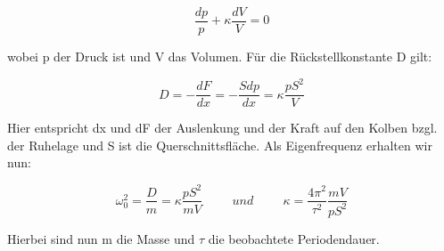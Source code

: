 \documentclass{article}
\begin{document}
{\begin{equation}
\frac{dp}{p}+\kappa \frac{dV}{V}=0
\end{equation}

wobei p der Druck ist und V das Volumen. Für die Rückstellkonstante D gilt:

\begin{equation}
D=-\frac{dF}{dx}=-\frac{Sdp}{dx}=\kappa \frac{pS^2}{V}
\end{equation}

Hier entspricht dx und dF der Auslenkung und der Kraft auf den Kolben bzgl. der Ruhelage und S ist die Querschnittsfläche. Als Eigenfrequenz erhalten wir nun:

\begin{equation}
\label{25}
\omega_{0}^2=\frac{D}{m}=\kappa \frac{pS^2}{mV} \hspace{1cm} und \hspace{1cm} \kappa =\frac{4\pi ^2}{\tau ^2} \frac{mV}{pS^2}
\end{equation}

Hierbei sind nun m die Masse und \(\tau\) die beobachtete Periodendauer.

{\begin{center}
\begin{minipage}{\linewidth}
\centering
{}
\label{wtd}
\end{minipage}
\end{center}

\newpage
}}
\end{document}

